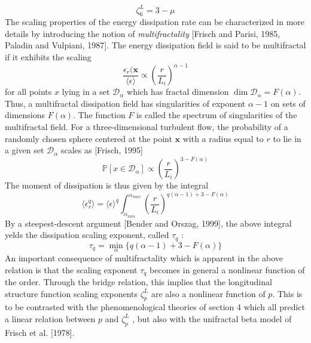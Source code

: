\begin{equation}
    \zeta_6^L=3-\mu
\end{equation}
The scaling properties of the energy dissipation rate can be characterized in more details by introducing the notion of \emph{multifractality} [Frisch and Parisi, 1985, Paladin and Vulpiani, 1987]. The energy dissipation field is said to be multifractal if it exhibits the scaling
\begin{equation}
    \frac{\epsilon_r(\mathbf{x}}{\langle\epsilon\rangle}\propto\left(\frac{r}{L_i}\right)^{\alpha-1}
\end{equation}
for all points $x$ lying in a set $\mathcal{D}_\alpha$ which has fractal dimension $\dim \mathcal{D}_\alpha = F(\alpha)$. Thus, a multifractal dissipation
field has singularities of exponent $\alpha-1$ on sets of dimensions $F(\alpha)$. The function $F$ is called the spectrum of singularities of the multifractal field. 
For a three-dimensional turbulent flow, the probability of a randomly chosen sphere centered at the point $\mathbf{x}$ with a radius equal to $r$ to lie in a given set $\mathcal{D}_\alpha$ scales as [Frisch, 1995]
\begin{equation}
    \mathbb{P}[x\in\mathcal{D}_\alpha]\propto\left(\frac{r}{L_i}\right)^{3-F(\alpha)}
\end{equation}
The moment of dissipation is thus given by the integral 
\begin{equation}
    \langle\epsilon_r^q\rangle=\langle\epsilon\rangle^q\int_{\alpha_{min}}^{\alpha_{max}}\left(\frac{r}{L_i}\right)^{q(\alpha-1)+3-F(\alpha)}
\end{equation}
By a steepest-descent argument [Bender and Orszag, 1999], the above integral yelds the dissipation scaling exponent, called $\tau_q$ :
\begin{equation}
    \tau_q=\min_\alpha\{q(\alpha-1)+3-F(\alpha)\}
\end{equation}
An important consequence of multifractality which is apparent in the above relation is that the scaling exponent $\tau_q$ becomes in general a nonlinear function of the order. Through the bridge relation, this implies that the longitudinal structure function scaling exponents $\zeta_p^L$ are also a nonlinear function of $p$.
This is to be contrasted with the phenomenological theories of section 4 which all predict a linear relation between $p$ and $\zeta_p^L$ , but also with the unifractal beta model of Frisch et al. [1978].

